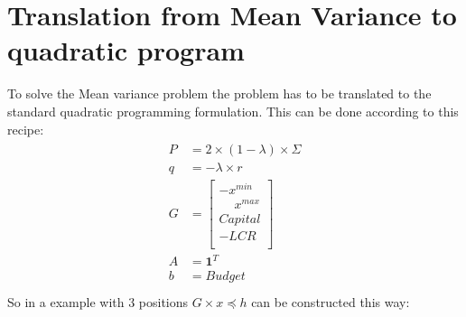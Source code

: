 \documentclass[letterpaper,10pt,english]{jupyterBook}
\begin{document}
\section{Translation from Mean Variance to quadratic program}
\label{\detokenize{content/howto/optimization/Optimize_simpel:translation-from-mean-variance-to-quadratic-program}}
\sphinxAtStartPar
To solve the Mean variance problem the problem has to be translated to the standard quadratic programming formulation. This can be done according to this recipe:
\begin{equation*}
\begin{split}
\begin{array}{ll}
P & = 2\times (1-\lambda)\times  \Sigma \\
q & = -\lambda\times r \\ 
G &= \begin{bmatrix} -x^{min} \\ 
\phantom{-}x^{max} \\ 
 Capital \\ 
 -LCR\\ 
 \end{bmatrix}\\
A &= \mathbf 1^T \\
b &= Budget\\
\end{array}
\end{split}
\end{equation*}
\sphinxAtStartPar
So in a example with 3 positions \( G \times x \preceq h  \) can be constructed this way:
\end{document}
